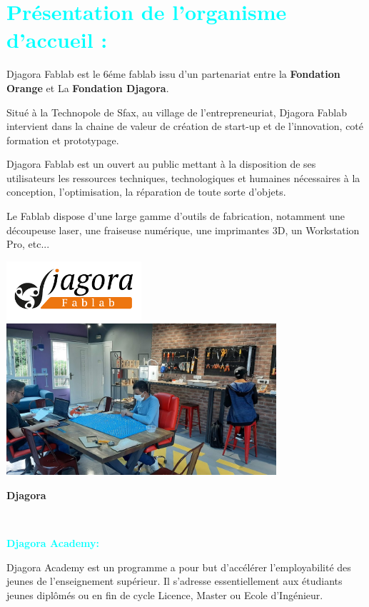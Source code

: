 \section{\textcolor{cyan}{Présentation de l’organisme d’accueil :}}
Djagora Fablab est le 6éme fablab issu d'un partenariat entre la \textbf{Fondation Orange} et La \textbf{Fondation Djagora}.\par
Situé à la Technopole de Sfax, au village de l'entrepreneuriat, Djagora Fablab intervient dans la chaine de valeur de création de start-up et de l'innovation, coté formation et prototypage.\par
Djagora Fablab est un ouvert au public mettant à la disposition de ses utilisateurs les ressources techniques, technologiques et humaines nécessaires à la conception, l’optimisation, la réparation de toute sorte d’objets.\par
Le Fablab dispose d'une large gamme d'outils de fabrication, notamment une découpeuse laser, une fraiseuse numérique, une imprimantes 3D, un Workstation Pro, etc...
\par
\begin{center}
    \includegraphics[width=5cm]{images/djagora2.png}
    \includegraphics[width=10cm]{images/djagoraImage.png}
    \caption{\textbf{Djagora}}
    \label{fig:my_label}\\
\end{center}
\textbf{\textcolor{cyan}{Djagora Academy:}}\par
Djagora Academy est un programme a pour but d’accélérer l’employabilité des jeunes de l’enseignement supérieur. Il s’adresse essentiellement aux étudiants jeunes diplômés ou en fin de cycle Licence, Master ou Ecole d’Ingénieur.\par
